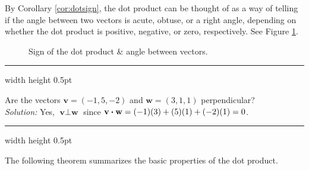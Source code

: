 By Corollary \ref{cor:dotsign}, the dot product can be thought of as a way of telling if the angle between two vectors
is acute, obtuse, or a right angle, depending on whether the dot product is positive, negative, or zero,
respectively. See Figure \ref{fig:dotsign}.

\begin{figure}[h]
 \centering
 \qquad\qquad
 \qquad\qquad
 \caption[]{\quad Sign of the dot product \& angle between vectors.}
 \label{fig:dotsign}
\end{figure}

\hrule width \textwidth height 0.5pt
\begin{exmp}
 Are the vectors $\textbf{v} = (-1,5,-2)$ and $\textbf{w} = (3,1,1)$ perpendicular?\smallskip\\\emph{Solution:}
 Yes, $\textbf{v} \perp \textbf{w}$ since $\textbf{v} \bm{\cdot} \textbf{w} = (-1)(3) + (5)(1) + (-2)(1) = 0$.
\end{exmp}
\hrule width \textwidth height 0.5pt
\medskip

The following theorem summarizes the basic properties of the dot product.


